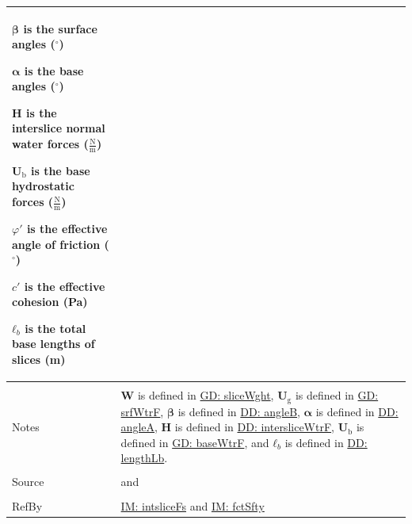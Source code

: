 \documentclass[12pt]{article}
\begin{document}
\begin{minipage}{\textwidth}
\begin{tabular}{>{\raggedright}p{}>{\raggedright\arraybackslash}p{}}
\begin{symbDescription}
              \item{$\mathbf{β}$ is the surface angles (${}^{\circ}$)}
              \item{$\mathbf{α}$ is the base angles (${}^{\circ}$)}
              \item{$\mathbf{H}$ is the interslice normal water forces ($\frac{\text{N}}{\text{m}}$)}
              \item{${\mathbf{U}_{\text{b}}}$ is the base hydrostatic forces ($\frac{\text{N}}{\text{m}}$)}
              \item{$φ'$ is the effective angle of friction (${}^{\circ}$)}
              \item{$c'$ is the effective cohesion (Pa)}
              \item{${\mathbf{ℓ}_{b}}$ is the total base lengths of slices (m)}
              \end{symbDescription}
\\ \midrule \\
Notes & $\mathbf{W}$ is defined in \hyperref[GD:sliceWght]{GD: sliceWght}, ${\mathbf{U}_{\text{g}}}$ is defined in \hyperref[GD:srfWtrF]{GD: srfWtrF}, $\mathbf{β}$ is defined in \hyperref[DD:angleB]{DD: angleB}, $\mathbf{α}$ is defined in \hyperref[DD:angleA]{DD: angleA}, $\mathbf{H}$ is defined in \hyperref[DD:intersliceWtrF]{DD: intersliceWtrF}, ${\mathbf{U}_{\text{b}}}$ is defined in \hyperref[GD:baseWtrF]{GD: baseWtrF}, and ${\mathbf{ℓ}_{b}}$ is defined in \hyperref[DD:lengthLb]{DD: lengthLb}.
\\ \midrule \\
Source & \cite{chen2005} and \cite{karchewski2012}
\\ \midrule \\
RefBy & \hyperref[IM:intsliceFs]{IM: intsliceFs} and \hyperref[IM:fctSfty]{IM: fctSfty}
\\ \bottomrule
\end{tabular}
\end{minipage}
\par~
\end{document}
